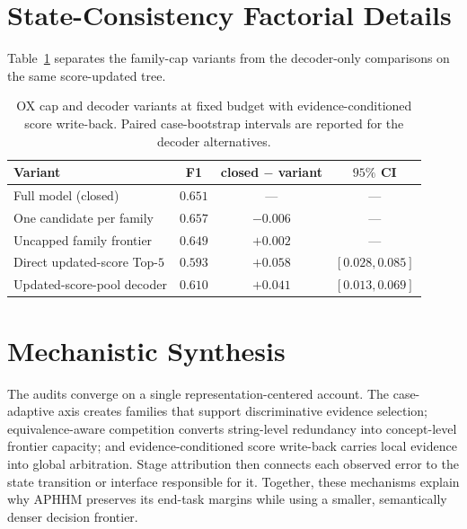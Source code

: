 \documentclass[letterpaper]{article}
\begin{document}
\section{State-Consistency Factorial Details}

Table~\ref{tab:state-detail} separates the family-cap variants from the decoder-only comparisons on the same score-updated tree.

\begin{table}[tb]
\centering
\small
\begin{tabular}{@{}p{2.35cm}ccc@{}}
\toprule
Variant & F1 & closed $-$ variant & $95\%$ CI \\
\midrule
Full model (closed) & $0.651$ & --- & --- \\
One candidate per family & $0.657$ & $-0.006$ & --- \\
Uncapped family frontier & $0.649$ & $+0.002$ & --- \\
Direct updated-score Top-$5$ & $0.593$ & $+0.058$ & $[0.028,0.085]$ \\
Updated-score-pool decoder & $0.610$ & $+0.041$ & $[0.013,0.069]$ \\
\bottomrule
\end{tabular}
\caption{OX cap and decoder variants at fixed budget with evidence-conditioned score write-back. Paired case-bootstrap intervals are reported for the decoder alternatives.}
\label{tab:state-detail}
\end{table}

\section{Mechanistic Synthesis}

The audits converge on a single representation-centered account.
The case-adaptive axis creates families that support discriminative evidence selection; equivalence-aware competition converts string-level redundancy into concept-level frontier capacity; and evidence-conditioned score write-back carries local evidence into global arbitration.
Stage attribution then connects each observed error to the state transition or interface responsible for it.
Together, these mechanisms explain why APHHM preserves its end-task margins while using a smaller, semantically denser decision frontier.


\end{document}
